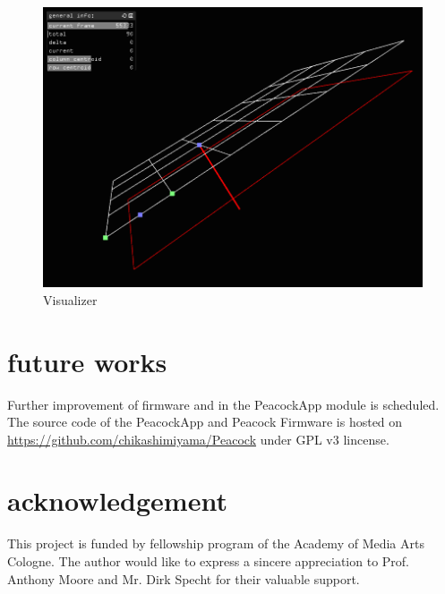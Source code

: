 \documentclass{nime-alternate}
\begin{document}
\begin{figure}[htbp]
       \begin{center}
              \includegraphics[scale=0.3]{visualizer.png}
       \end{center}
       \caption{Visualizer}
       \label{fig:visualizer}
\end{figure}


\section{future works}

Further improvement of firmware and in the PeacockApp module is scheduled.
The source code of the PeacockApp and Peacock Firmware is hosted on \url{https://github.com/chikashimiyama/Peacock} under GPL v3 lincense.

\section{acknowledgement}
This project is funded by fellowship program of the Academy of Media Arts Cologne. The author would like to express a sincere appreciation to Prof. Anthony Moore and Mr. Dirk Specht for their valuable support.



\end{document}
